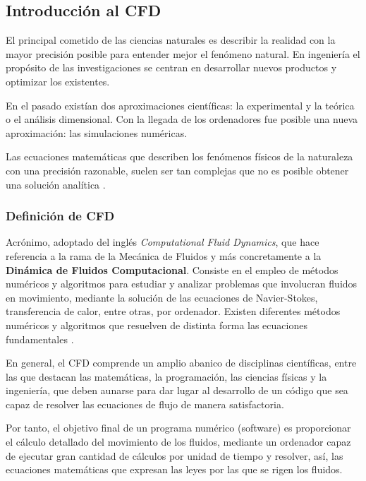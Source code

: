 \subsection{Introducción al CFD}\label{header-n0}

El principal cometido de las ciencias naturales es describir la realidad
con la mayor precisión posible para entender mejor el fenómeno natural.
En ingeniería el propósito de las investigaciones se centran en
desarrollar nuevos productos y optimizar los existentes.

En el pasado existían dos aproximaciones científicas: la experimental y
la teórica o el análisis dimensional. Con la llegada de los ordenadores
fue posible una nueva aproximación: las simulaciones numéricas.

Las ecuaciones matemáticas que describen los fenómenos físicos de la
naturaleza con una precisión razonable, suelen ser tan complejas que no
es posible obtener una solución analítica \cite{Mier04}. 

\subsubsection{Definición de CFD}\label{header-n8}

Acrónimo, adoptado del inglés \emph{Computational Fluid Dynamics}, que
hace referencia a la rama de la Mecánica de Fluidos y más concretamente
a la \textbf{Dinámica de Fluidos Computacional}. Consiste en el empleo
de métodos numéricos y algoritmos para estudiar y analizar problemas que
involucran fluidos en movimiento, mediante la solución de las ecuaciones
de Navier-Stokes, transferencia de calor, entre otras, por ordenador.
Existen diferentes métodos numéricos y algoritmos que resuelven de
distinta forma las ecuaciones fundamentales \cite{orrego09}.

En general, el CFD comprende un amplio abanico de disciplinas
científicas, entre las que destacan las matemáticas, la programación,
las ciencias físicas y la ingeniería, que deben aunarse para dar lugar
al desarrollo de un código que sea capaz de resolver las ecuaciones de
flujo de manera satisfactoria.

Por tanto, el objetivo final de un programa numérico (software) es
proporcionar el cálculo detallado del movimiento de los fluidos,
mediante un ordenador capaz de ejecutar gran cantidad de cálculos por
unidad de tiempo y resolver, así, las ecuaciones matemáticas que
expresan las leyes por las que se rigen los fluidos.

